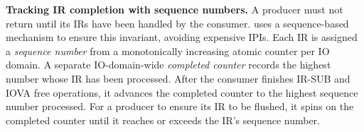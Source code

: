 


{\bf Tracking IR completion with sequence numbers.}
A producer must not return 
    until its IRs have been handled by the consumer.
    \brand uses a sequence-based mechanism to ensure this invariant,
     avoiding expensive IPIs.
Each IR is assigned a \emph{sequence number} from a monotonically increasing atomic counter per IO domain.
A separate IO-domain-wide \emph{completed counter} records the highest number whose IR has been processed.
After the consumer finishes IR-SUB and IOVA free operations,
    it advances the completed counter to the highest sequence number processed.
For a producer to ensure its IR to be flushed,
    it spins on the completed counter until it reaches or exceeds the IR's sequence number.



